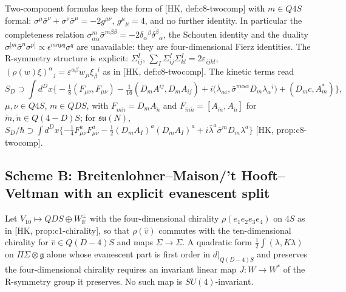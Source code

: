 \begin{remark}
\label{rem:D2c}
Two-component formulas keep the form of [HK, def:c8-twocomp] with $m\in Q4S$ formal: $\sigma^\mu\bar\sigma^\nu+\sigma^\nu\bar\sigma^\mu=-2g^{\mu\nu}$, $g^\mu{}_\mu=4$, and no further identity. In particular the completeness relation $\sigma^m_{\alpha\dot\alpha}\bar\sigma^{m\dot\beta\beta}=-2\delta_\alpha{}^\beta\delta^{\dot\beta}{}_{\dot\alpha}$, the Schouten identity and the duality $\sigma^{[m}\bar\sigma^n\sigma^{p]}\propto\epsilon^{mnpq}\sigma^q$ are unavailable: they are four-dimensional Fierz identities. The R-symmetry structure is explicit: $\Sigma^I_{ij}$, $\sum_I\Sigma^I_{ij}\Sigma^I_{kl}=2\varepsilon_{ijkl}$, $(\rho(w)\xi)^\alpha{}_j=\varepsilon^{\alpha\beta}w_{ji}\xi_\beta{}^i$ as in [HK, def:c8-twocomp]. The kinetic terms read
\[
S_D\supset\int d^Dx\Big\{-\tfrac18(F_{\mu\nu},F_{\mu\nu})-\tfrac1{16}(D_mA^{ij},D_mA_{ij})+i\big(\bar\lambda_{\dot\alpha i},\bar\sigma^{m\dot\alpha\alpha}D_m\lambda_\alpha{}^i\big)+(D_mc,A^*_m)\Big\},
\]
$\mu,\nu\in Q4S$, $m\in QDS$,
with $F_{m\tilde n}=D_mA_{\tilde n}$ and $F_{\tilde m\tilde n}=[A_{\tilde m},A_{\tilde n}]$ for $\tilde m,\tilde n\in Q(4{-}D)S$; for $\mathfrak{su}(N)$, $S_D/\hbar\supset\int d^Dx\{-\frac14F^a_{\mu\nu}F^a_{\mu\nu}-\frac12(D_mA_I)^a(D_mA_I)^a+i\bar\lambda^a\bar\sigma^mD_m\lambda^a\}$ [HK, prop:c8-twocomp].
\end{remark}

\subsection{Scheme B: Breitenlohner--Maison/'t Hooft--Veltman with an explicit evanescent split}

\begin{proposition}
\label{prop:nogo}
Let $V_{10}\mapsto QDS\oplus W^\perp_{\mathbb R}$ with the four-dimensional chirality $\rho(e_1e_2e_3e_4)$ on $4S$ as in [HK, prop:c1-chirality], so that $\rho(\hat v)$ commutes with the ten-dimensional chirality for $\hat v\in Q(D{-}4)S$ and maps $\Sigma\to\Sigma$. A quadratic form $\frac12\int(\lambda,K\lambda)$ on $\Pi\Sigma\otimes\mathfrak g$ alone whose evanescent part is first order in $d|_{Q(D-4)S}$ and preserves the four-dimensional chirality requires an invariant linear map $J\colon W\to W^*$ of the R-symmetry group it preserves. No such map is $SU(4)$-invariant.
\end{proposition}

